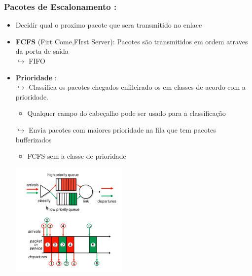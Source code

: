        \subsubsection*{Pacotes de Escalonamento :}
            \begin{itemize}[left=0.5cm, align=left, nosep]
                \item Decidir qual o proximo pacote que sera transmitido no enlace
                
                \item \textbf{FCFS} (Firt Come,FIrst Server): Pacotes são transmitidos em ordem atraves da porta de saida \\
                    $\hookrightarrow$ FIFO

                \item \textbf{Prioridade} : \\
                    $\hookrightarrow$ Classifica os pacotes chegados enfileirado-os em classes de acordo com a prioridade.
                        \begin{itemize}[left=0.5cm, align=left, nosep]
                            \item Qualquer campo do cabeçalho pode ser usado para a classificação
                        \end{itemize}    
                    $\hookrightarrow$ Envia pacotes com maiores prioridade na fila que tem pacotes bufferizados     
                        \begin{itemize}[left=0.5cm, align=left, nosep]
                            \item FCFS sem a classe de prioridade
                        \end{itemize}  

                    \begin{center}
                        \includegraphics[width=0.45\textwidth]{img/cap-04/prioridade.png}
                    \end{center}
               

\end{itemize}
